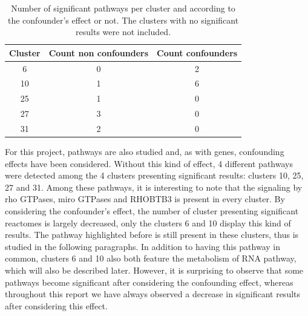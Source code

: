 \documentclass[a4paper, 11pt]{article}
\begin{document}
\begin{multicols}{2}
\begin{table}[H]
\begin{tabular}{c|cc}
Cluster & \multicolumn{1}{c|}{Count non confounders} & Count confounders \\ \hline
6 & 0 & 2 \\
10 & 1 & 6 \\
25 & 1 & 0 \\
27 & 3 & 0 \\
31 & 2 & 0
\end{tabular}
\caption{Number of significant pathways per cluster and according to the confounder's effect or not. The clusters with no significant results were not included.}
\label{tab:sigPath}
\end{table}

For this project, pathways are also studied and, as with genes, confounding effects have been considered. Without this kind of effect, 4 different pathways were detected among the 4 clusters presenting significant results: clusters 10, 25, 27 and 31. Among these pathways, it is interesting to note that the signaling by rho GTPases, miro GTPases and RHOBTB3 is present in every cluster. By considering the confounder's effect, the number of cluster presenting significant reactomes is largely decreased, only the clusters 6 and 10 display this kind of results. The pathway highlighted before is still present in these clusters, thus is studied in the following paragraphs. In addition to having this pathway in common, clusters 6 and 10 also both feature the metabolism of RNA pathway, which will also be described later. However, it is surprising to observe that some pathways become significant after considering the confounding effect, whereas throughout this report we have always observed a decrease in significant results after considering this effect.


\end{multicols}
\end{document}
